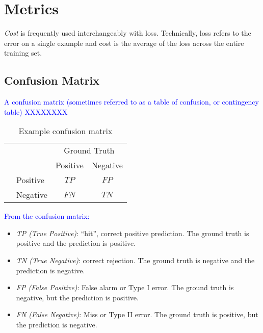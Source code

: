 \section{Metrics}

\emph{Cost} is frequently used interchangeably with loss. Technically, loss refers to the error on a single example and cost is the average of the loss across the entire training set.

\subsection{Confusion Matrix}
\textcolor{blue}{A confusion matrix (sometimes referred to as a table of confusion, or contingency table) XXXXXXXX}

\begin{table}
	\centering
	\begin{tabular}{l|l|c|c|}
		\multicolumn{2}{c}{}&\multicolumn{2}{c}{Ground Truth}\\ 
		\cline{3-4}
		\multicolumn{2}{c|}{}&Positive&Negative\\ 
		\cline{2-4}
		\multirow{2}{*}{\rotatebox{90}{Pred}}& Positive & $TP$ & $FP$ \\ 
		\cline{2-4}
		& Negative & $FN$ & $TN$ \\ 
		\cline{2-4}
	\end{tabular}
	\caption{Example confusion matrix}
	\label{tab:sample_conf_matrix}
\end{table}

\textcolor{blue}{From the confusion matrix:}

\begin{itemize}
	
\item \textit{TP (True Positive)}: ``hit'', correct positive prediction. The ground truth is positive and the prediction is positive.

\item \textit{TN (True Negative)}: correct rejection. The ground truth is negative and the prediction is negative.

\item \textit{FP (False Positive)}: False alarm or Type I error. The ground truth is negative, but the prediction is positive.

\item \textit{FN (False Negative)}: Miss or Type II error. The ground truth is positive, but the prediction is negative.
	
\end{itemize}

